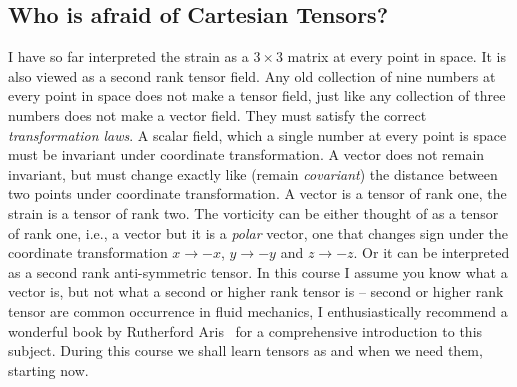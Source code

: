 \begin{subappendices}
\section{Who is afraid of Cartesian Tensors?}
I have so far interpreted the strain as a $3\times 3$ matrix at every
point in space. It is also viewed as a second rank tensor field. 
Any old collection of nine numbers at every point in space does not
make a tensor field, just like any collection of three numbers does
not make a vector field. They must satisfy the correct
\textit{transformation laws}. 
 A scalar field, which a single number
at every point is space must be invariant under coordinate
transformation. A vector  does not remain invariant, but must change
exactly like (remain \textit{covariant})  the distance between two points
under coordinate transformation. A vector is a tensor of rank one, the
strain is a tensor of rank two. The vorticity can be either thought of
as a tensor of rank one, i.e., a vector but it is a \textit{polar}
vector, one that changes sign under the coordinate transformation
$x\to -x$, $y\to -y$ and $z\to -z$. Or it can be interpreted as a
second rank anti-symmetric tensor. In this course I assume you know
what a vector is, but not what a second or higher rank tensor is --
second or higher rank tensor are common occurrence in fluid mechanics,
I enthusiastically recommend a wonderful book by Rutherford
Aris~\cite{Aris} for a comprehensive introduction to this subject. 
During this course we shall learn tensors as and when we need them,
starting now. 


\end{subappendices}
